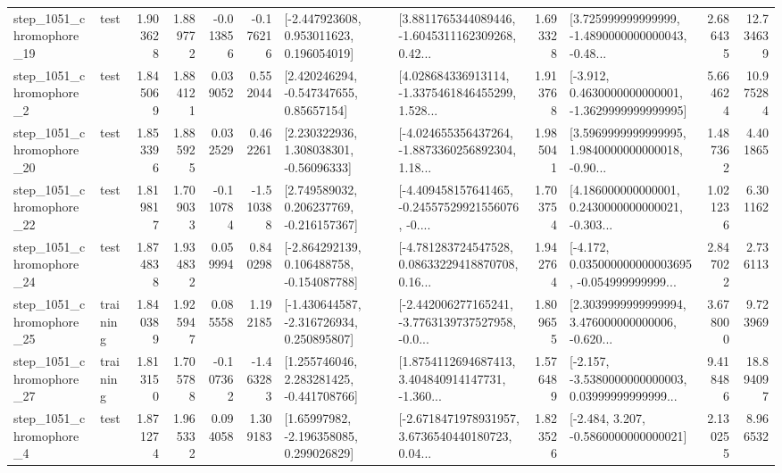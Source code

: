 \begin{tabular}{llrrrrllrlrr}
 step\_1051\_chromophore\_19 &      test &      1.903628 &    1.889772 &     -0.013856 & -0.176216 &    [-2.447923608, 0.953011623, 0.196054019] &  [3.8811765344089446, -1.6045311162309268, 0.42... &       1.693328 &  [3.725999999999999, -1.4890000000000043, -0.48... &            2.686435 &         12.734639 \\
  step\_1051\_chromophore\_2 &      test &      1.845069 &    1.884121 &      0.039052 &  0.552044 &     [2.420246294, -0.547347655, 0.85657154] &  [4.028684336913114, -1.3375461846455299, 1.528... &       1.913768 &  [-3.912, 0.4630000000000001, -1.3629999999999995] &            5.664624 &         10.975284 \\
 step\_1051\_chromophore\_20 &      test &      1.853396 &    1.885925 &      0.032529 &  0.462261 &     [2.230322936, 1.308038301, -0.56096333] &  [-4.024655356437264, -1.8873360256892304, 1.18... &       1.985041 &  [3.5969999999999995, 1.9840000000000018, -0.90... &            1.487362 &          4.401865 \\
 step\_1051\_chromophore\_22 &      test &      1.819817 &    1.709033 &     -0.110784 & -1.510388 &    [2.749589032, 0.206237769, -0.216157367] &  [-4.409458157641465, -0.24557529921556076, -0.... &       1.703754 &  [4.186000000000001, 0.2430000000000021, -0.303... &            1.021236 &          6.301162 \\
 step\_1051\_chromophore\_24 &      test &      1.874838 &    1.934832 &      0.059994 &  0.840298 &   [-2.864292139, 0.106488758, -0.154087788] &  [-4.781283724547528, 0.08633229418870708, 0.16... &       1.942764 &  [-4.172, 0.035000000000003695, -0.054999999999... &            2.847022 &          2.736113 \\
 step\_1051\_chromophore\_25 &  training &      1.840389 &    1.925947 &      0.085558 &  1.192185 &   [-1.430644587, -2.316726934, 0.250895807] &  [-2.442006277165241, -3.7763139737527958, -0.0... &       1.809655 &  [2.3039999999999994, 3.476000000000006, -0.620... &            3.678000 &          9.723969 \\
 step\_1051\_chromophore\_27 &  training &      1.813150 &    1.705788 &     -0.107362 & -1.463283 &    [1.255746046, 2.283281425, -0.441708766] &  [1.8754112694687413, 3.404840914147731, -1.360... &       1.576489 &  [-2.157, -3.5380000000000003, 0.03999999999999... &            9.418486 &         18.894097 \\
  step\_1051\_chromophore\_4 &      test &      1.871274 &    1.965332 &      0.094058 &  1.309183 &     [1.65997982, -2.196358085, 0.299026829] &  [-2.6718471978931957, 3.6736540440180723, 0.04... &       1.823526 &               [-2.484, 3.207, -0.5860000000000021] &            2.130255 &          8.966532 \\

\end{tabular}
